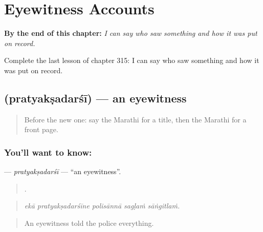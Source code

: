 
\chapter{Eyewitness Accounts}
\label{ch:mr-eyewitness-accounts}

\begin{chapteropening}
\textbf{By the end of this chapter:} \emph{I can say who saw something and how it was put on record.}

Complete the last lesson of chapter 315: I can say who saw something and how it was put on record.
\end{chapteropening}

\section[\texorpdfstring{\mr{प्रत्यक्षदर्शी} (pratyakṣadarśī)}{प्रत्यक्षदर्शी (pratyakṣadarśī)}]{ (pratyakṣadarśī) — an eyewitness}

\label{lesson:MR-C315-pratyaksadarsi}



\begin{quote}
Before the new one: say the Marathi for a title, then the Marathi for a front page.
\end{quote}

\subsection*{You'll want to know: }
\textbf{} — \emph{pratyakṣadarśī} — \textquotedblleft{}an eyewitness\textquotedblright{}.

\begin{quote}
    .
\end{quote}

\begin{quote}
\emph{ekā pratyakṣadarśīne polisānnā sagḷaṁ sāṅgitlaṁ.}
\end{quote}

\begin{quote}
An eyewitness told the police everything.
\end{quote}


